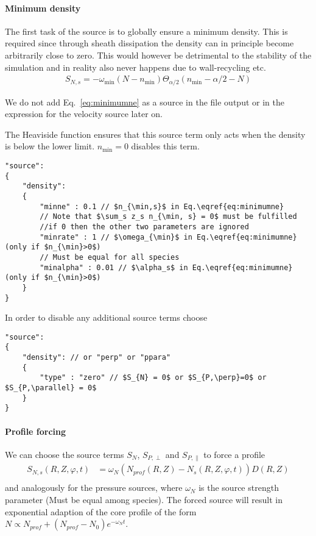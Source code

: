 \paragraph{Minimum density}

The first task of the source is to globally ensure a minimum density. This
is required since through sheath dissipation the density can in
principle become arbitrarily close to zero. This would however
be detrimental to the stability of the simulation and in reality
also never happens due to wall-recycling etc.
\begin{align}
    S_{N,s} = -\omega_{\min} ( N - n_{\min}) \Theta_{\alpha/2}( n_{\min}-\alpha/2 -N)
    \label{eq:minimumne}
\end{align}
\begin{tcolorbox}[title=Note]
    We do not add Eq.~\eqref{eq:minimumne} as a source in the file output or in
    the expression for the velocity source later on.
\end{tcolorbox}
The Heaviside function ensures that this source term only acts when the density
is below the lower limit. $n_{\min}=0$ disables this term.
\begin{verbatim}
"source":
{
    "density":
    {
        "minne" : 0.1 // $n_{\min,s}$ in Eq.\eqref{eq:minimumne}
        // Note that $\sum_s z_s n_{\min, s} = 0$ must be fulfilled
        //if 0 then the other two parameters are ignored
        "minrate" : 1 // $\omega_{\min}$ in Eq.\eqref{eq:minimumne} (only if $n_{\min}>0$)
        // Must be equal for all species
        "minalpha" : 0.01 // $\alpha_s$ in Eq.\eqref{eq:minimumne} (only if $n_{\min}>0$)
    }
}
\end{verbatim}
\noindent
In order to disable any additional source terms choose
\begin{verbatim}
"source":
{
    "density": // or "perp" or "ppara"
    {
        "type" : "zero" // $S_{N} = 0$ or $S_{P,\perp}=0$ or $S_{P,\parallel} = 0$
    }
}
\end{verbatim}

\paragraph{Profile forcing}
\noindent We can choose the source terms $S_N$, $S_{P,\perp}$ and $S_{P,\parallel}$ to force a profile
\begin{align} \label{eq:electron_source}
    S_{N,s}(R,Z,\varphi, t) &= \omega_N (N_{prof}(R,Z) - N_s(R,Z,\varphi, t))D(R,Z) \\
\end{align}
and analogously for the pressure sources,
where $\omega_N$ is the source strength parameter (Must be equal among species).
The forced source will result in exponential adaption of the core
profile of the form $N \propto N_{prof}+(N_{prof}-N_{0})e^{-\omega_Nt}$.


